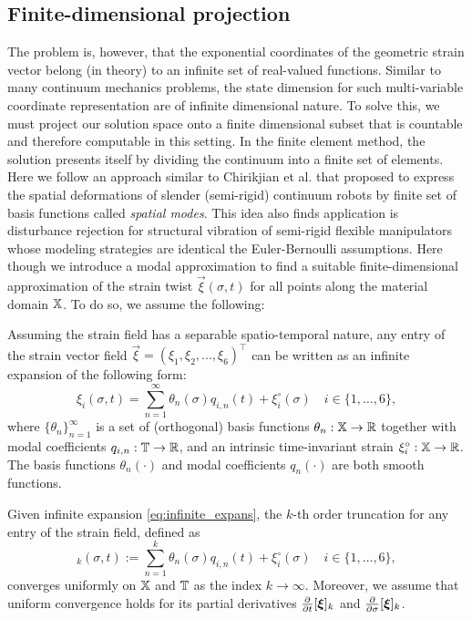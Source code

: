 \subsection{Finite-dimensional projection}
The problem is, however, that the exponential coordinates of the geometric strain vector belong (in theory) to an infinite set of real-valued functions. Similar to many continuum mechanics problems, the state dimension for such multi-variable coordinate representation are of infinite dimensional nature. To solve this, we must project our solution space onto a finite dimensional subset that is countable and therefore computable in this setting. In the finite element method, the solution presents itself by dividing the continuum into a finite set of elements. Here we follow an approach similar to Chirikjian et al. \cite{Chirikjian1991,Chirikjian1992} that proposed to express the spatial deformations of slender (semi-rigid) continuum robots by finite set of basis functions called \textit{spatial modes}. This idea also finds application is disturbance rejection for structural vibration of semi-rigid flexible manipulators whose modeling strategies are identical the Euler-Bernoulli assumptions. Here though we introduce a modal approximation to find a suitable finite-dimensional approximation of the strain twist $\vec{\xi}(\sigma,t)$ for all points along the material domain $\mathbb{X}$. To do so, we assume the following: %
\begin{asm}
\vspace{1mm}
Assuming the strain field has a separable spatio-temporal nature, any entry of the strain vector field $\vec{\xi} = \left( \xi_1, \xi_2, ..., \xi_6 \right)^\top$ can be written as an infinite expansion of the following form:
%
\begin{equation}
\xi_i(\sigma,t) = \sum_{n=1}^\infty \theta_{n}(\sigma)q_{i,n}(t) + \xi^\circ_{i}(\sigma) \quad i\in\{1,\hdots,6\},
\label{eq:infinite_expans}
\end{equation}
%
where $\{\theta_{n}\}^\infty_{n=1}$ is a set of (orthogonal) basis functions $\theta_{n}: \mathbb{X} \to \mathbb{R}$ together with modal coefficients $q_{i,n}: \mathbb{T} \to \mathbb{R}$, and an intrinsic time-invariant strain $\xi^\circ_{i}: \mathbb{X} \to \mathbb{R}$. The basis functions $\theta_{n}(\cdot)$ and modal coefficients $q_n(\cdot)$ are both smooth functions.
\end{asm}

\begin{asm}
Given infinite expansion \eqref{eq:infinite_expans}, the $k$-th order truncation for any entry of the strain field, defined as
%
\begin{equation}
[\xi_i]_k(\sigma,t) := \sum_{n=1}^k \theta_n(\sigma)q_{i,n}(t) + \xi^\circ_{i}(\sigma) \quad i\in\{1,\hdots,6\},
\end{equation}
%
converges uniformly on $\mathbb{X}$ and $\mathbb{T}$ as the index $k \to \infty$. Moreover, we assume that uniform convergence holds for its partial derivatives $\tfrac{\partial}{\partial t} [\boldsymbol{\xi}]_k$ and $\tfrac{\partial}{\partial \sigma} [\boldsymbol{\xi}]_k$.
\end{asm}

